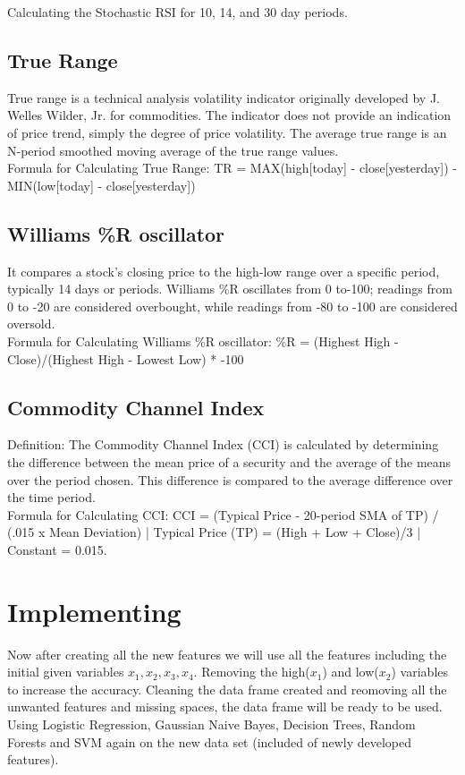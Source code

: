 \documentclass[conference]{IEEEtran}
\begin{document}
Calculating the Stochastic RSI for 10, 14, and 30 day periods.


\subsection{True Range}
True range is a technical analysis volatility indicator originally developed by J. Welles Wilder, Jr. for commodities. The indicator does not provide an indication of price trend, simply the degree of price volatility. The average true range is an N-period smoothed moving average of the true range values.\\

Formula for Calculating True Range: TR = MAX(high[today] - close[yesterday]) - MIN(low[today] - close[yesterday])

\subsection{Williams \%R oscillator}
It compares a stock's closing price to the high-low range over a specific period, typically 14 days or periods. Williams \%R oscillates from 0 to-100; readings from 0 to -20 are considered overbought, while readings from -80 to -100 are considered oversold.\\

Formula for Calculating Williams \%R oscillator: \%R = (Highest High - Close)/(Highest High - Lowest Low) * -100

\subsection{Commodity Channel Index}
Definition: The Commodity Channel Index (CCI) is calculated by determining the difference between the mean price of a security and the average of the means over the period chosen. This difference is compared to the average difference over the time period.\\

Formula for Calculating CCI: CCI = (Typical Price - 20-period SMA of TP) / (.015 x Mean Deviation) | Typical Price (TP) = (High + Low + Close)/3 | Constant = 0.015.

\section{Implementing }
Now after creating all the new features we will use all the features including the initial given variables $x_{1}, x_{2}, x_{3}, x_{4}$. Removing the high($x_{1}$) and low($x_{2}$) variables to increase the accuracy. Cleaning the data frame created and reomoving all the unwanted features and missing spaces, the data frame will be ready to be used. Using Logistic Regression, Gaussian Naive Bayes, Decision Trees, Random Forests and SVM again on the new data set (included of newly developed features).\\
\end{document}
